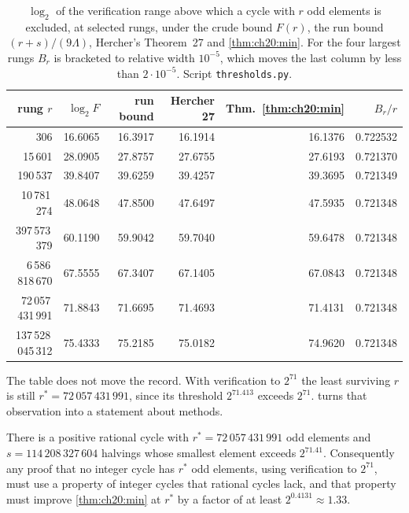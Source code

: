\begin{table}[t]
\centering
\small
\begin{tabular}{rrrrrr}
\toprule
rung $r$ & $\log_2F$ & run bound & Hercher 27 & Thm.~\ref{thm:ch20:min} & $B_r/r$\\
\midrule
306 & 16.6065 & 16.3917 & 16.1914 & 16.1376 & 0.722532\\
15\,601 & 28.0905 & 27.8757 & 27.6755 & 27.6193 & 0.721370\\
190\,537 & 39.8407 & 39.6259 & 39.4257 & 39.3695 & 0.721349\\
10\,781\,274 & 48.0648 & 47.8500 & 47.6497 & 47.5935 & 0.721348\\
397\,573\,379 & 60.1190 & 59.9042 & 59.7040 & 59.6478 & 0.721348\\
6\,586\,818\,670 & 67.5555 & 67.3407 & 67.1405 & 67.0843 & 0.721348\\
72\,057\,431\,991 & 71.8843 & 71.6695 & 71.4693 & 71.4131 & 0.721348\\
137\,528\,045\,312 & 75.4333 & 75.2185 & 75.0182 & 74.9620 & 0.721348\\
\bottomrule
\end{tabular}
\caption{$\log_2$ of the verification range above which a cycle with $r$ odd elements is excluded, at selected rungs, under the crude bound $F(r)$, the run bound $(r+s)/(9\Lambda)$, Hercher's Theorem~27 and \cref{thm:ch20:min}. For the four largest rungs $B_r$ is bracketed to relative width $10^{-5}$, which moves the last column by less than $2\cdot10^{-5}$. Script \texttt{thresholds.py}.}
\label{tab:ch20:thresh}
\end{table}

The table does not move the record. With verification to $2^{71}$ the least surviving $r$ is still $r^\ast=72\,057\,431\,991$, since its threshold $2^{71.413}$ exceeds $2^{71}$.  turns that observation into a statement about methods.

\begin{corollary}\label{cor:ch20:gap}
There is a positive rational cycle with $r^\ast=72\,057\,431\,991$ odd elements and $s=114\,208\,327\,604$ halvings whose smallest element exceeds $2^{71.41}$. Consequently any proof that no integer cycle has $r^\ast$ odd elements, using verification to $2^{71}$, must use a property of integer cycles that rational cycles lack, and that property must improve \cref{thm:ch20:min} at $r^\ast$ by a factor of at least $2^{0.4131}\approx1.33$.
\end{corollary}

